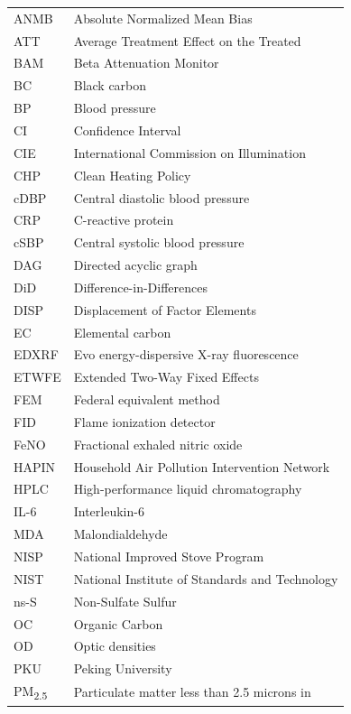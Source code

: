 \documentclass[
  letterpaper,
  DIV=11,
  numbers=noendperiod]{scrartcl}
\begin{document}
\begin{longtable}[]{@{}
  >{\raggedright\arraybackslash}p{}
  >{\raggedright\arraybackslash}p{}@{}}
\toprule\noalign{}
\endhead
\bottomrule\noalign{}
\endlastfoot
ANMB & Absolute Normalized Mean Bias \\
ATT & Average Treatment Effect on the Treated \\
BAM & Beta Attenuation Monitor \\
BC & Black carbon \\
BP & Blood pressure \\
CI & Confidence Interval \\
CIE & International Commission on Illumination \\
CHP & Clean Heating Policy \\
cDBP & Central diastolic blood pressure \\
CRP & C-reactive protein \\
cSBP & Central systolic blood pressure \\
DAG & Directed acyclic graph \\
DiD & Difference-in-Differences \\
DISP & Displacement of Factor Elements \\
EC & Elemental carbon \\
EDXRF & Evo energy-dispersive X-ray fluorescence \\
ETWFE & Extended Two-Way Fixed Effects \\
FEM & Federal equivalent method \\
FID & Flame ionization detector \\
FeNO & Fractional exhaled nitric oxide \\
HAPIN & Household Air Pollution Intervention Network \\
HPLC & High-performance liquid chromatography \\
IL-6 & Interleukin-6 \\
MDA & Malondialdehyde \\
NISP & National Improved Stove Program \\
NIST & National Institute of Standards and Technology \\
ns-S & Non-Sulfate Sulfur \\
OC & Organic Carbon \\
OD & Optic densities \\
PKU & Peking University \\
PM\textsubscript{2.5} & Particulate matter less than 2.5 microns in

\end{longtable}
\end{document}

